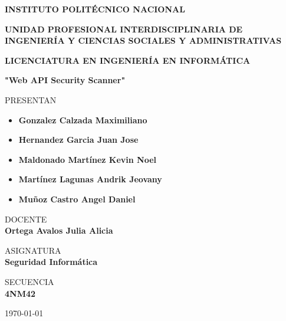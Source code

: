 \documentclass{article}
\begin{document}
	\begin{center}
        \vspace{0.8cm}
        \LARGE
        \textbf{INSTITUTO POLITÉCNICO NACIONAL}
        
        \vspace{0.8cm}
        \LARGE
        \textbf{UNIDAD PROFESIONAL INTERDISCIPLINARIA DE INGENIERÍA Y CIENCIAS SOCIALES Y ADMINISTRATIVAS}
        
        \vspace{0.8cm}	
        \Large
        \textbf{LICENCIATURA EN INGENIERÍA EN INFORMÁTICA}

        \vspace{0.8cm}
        \LARGE
        \textbf{"Web API Security Scanner"}

        \vspace{0.4cm}
        \large	
        PRESENTAN \\
        \vspace{0.2cm}
        \normalsize
        \begin{itemize}
            \item \textbf{Gonzalez Calzada Maximiliano}
            \item \textbf{Hernandez Garcia Juan Jose}
            \item \textbf{Maldonado Martínez Kevin Noel}
            \item \textbf{Martínez Lagunas Andrik Jeovany}
            \item \textbf{Muñoz Castro Angel Daniel}
        \end{itemize}
        
        \vspace{0.8cm}
        \normalsize	
        DOCENTE \\
        \vspace{0.2cm}
        \large
        \textbf{Ortega Avalos Julia Alicia}
        
        \vspace{0.8cm}
        \normalsize	
        ASIGNATURA \\
        \vspace{0.2cm}
        \large
        \textbf{Seguridad Informática}

        \vspace{0.8cm}
        \normalsize	
        SECUENCIA \\
        \vspace{0.2cm}
        \large
        \textbf{4NM42}
        
        \vspace{0.8cm}
        \today
	\end{center}
	
\end{document}
